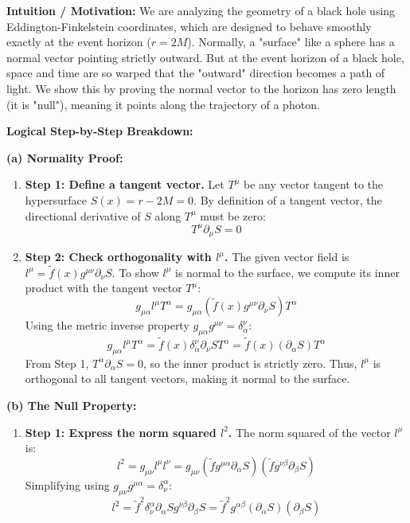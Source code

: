 \begin{solution}
\textbf{Intuition / Motivation:}
We are analyzing the geometry of a black hole using Eddington-Finkelstein coordinates, which are designed to behave smoothly exactly at the event horizon ($r=2M$). Normally, a "surface" like a sphere has a normal vector pointing strictly outward. But at the event horizon of a black hole, space and time are so warped that the "outward" direction becomes a path of light. We show this by proving the normal vector to the horizon has zero length (it is "null"), meaning it points along the trajectory of a photon.

\textbf{Logical Step-by-Step Breakdown:}

\textbf{(a) Normality Proof:}
\begin{enumerate}
    \item \textbf{Step 1: Define a tangent vector.}
    Let $T^\mu$ be any vector tangent to the hypersurface $S(x) = r - 2M = 0$. By definition of a tangent vector, the directional derivative of $S$ along $T^\mu$ must be zero:
    \[ T^\mu \partial_\mu S = 0 \]
    
    \item \textbf{Step 2: Check orthogonality with $l^\mu$.}
    The given vector field is $l^\mu = \tilde{f}(x) g^{\mu\nu} \partial_\nu S$.
    To show $l^\mu$ is normal to the surface, we compute its inner product with the tangent vector $T^\mu$:
    \[ g_{\mu\alpha} l^\mu T^\alpha = g_{\mu\alpha} (\tilde{f}(x) g^{\mu\nu} \partial_\nu S) T^\alpha \]
    Using the metric inverse property $g_{\mu\alpha} g^{\mu\nu} = \delta_\alpha^\nu$:
    \[ g_{\mu\alpha} l^\mu T^\alpha = \tilde{f}(x) \delta_\alpha^\nu \partial_\nu S T^\alpha = \tilde{f}(x) (\partial_\alpha S) T^\alpha \]
    From Step 1, $T^\alpha \partial_\alpha S = 0$, so the inner product is strictly zero. Thus, $l^\mu$ is orthogonal to all tangent vectors, making it normal to the surface.
\end{enumerate}

\textbf{(b) The Null Property:}
\begin{enumerate}
    \item \textbf{Step 1: Express the norm squared $l^2$.}
    The norm squared of the vector $l^\mu$ is:
    \[ l^2 = g_{\mu\nu} l^\mu l^\nu = g_{\mu\nu} (\tilde{f} g^{\mu\alpha} \partial_\alpha S) (\tilde{f} g^{\nu\beta} \partial_\beta S) \]
    Simplifying using $g_{\mu\nu} g^{\mu\alpha} = \delta_\nu^\alpha$:
    \[ l^2 = \tilde{f}^2 \delta_\nu^\alpha \partial_\alpha S g^{\nu\beta} \partial_\beta S = \tilde{f}^2 g^{\alpha\beta} (\partial_\alpha S) (\partial_\beta S) \]
    

\end{enumerate}
\end{solution}
